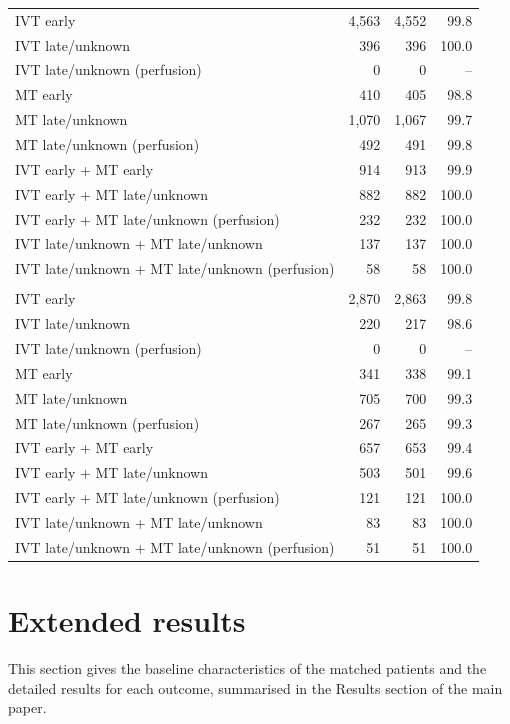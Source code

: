 {\begin{longtable}{p{7cm}rrr}
IVT early & 4,563 & 4,552 & 99.8 \\
IVT late/unknown & 396 & 396 & 100.0 \\
IVT late/unknown (perfusion) & 0 & 0 & -- \\
MT early & 410 & 405 & 98.8 \\
MT late/unknown & 1,070 & 1,067 & 99.7 \\
MT late/unknown (perfusion) & 492 & 491 & 99.8 \\
IVT early + MT early & 914 & 913 & 99.9 \\
IVT early + MT late/unknown & 882 & 882 & 100.0 \\
IVT early + MT late/unknown (perfusion) & 232 & 232 & 100.0 \\
IVT late/unknown + MT late/unknown & 137 & 137 & 100.0 \\
IVT late/unknown + MT late/unknown (perfusion) & 58 & 58 & 100.0 \\
\addlinespace
\multicolumn{4}{l}{\textbf{NIHSS 21--25} (untreated pool: 9,424)}\\
IVT early & 2,870 & 2,863 & 99.8 \\
IVT late/unknown & 220 & 217 & 98.6 \\
IVT late/unknown (perfusion) & 0 & 0 & -- \\
MT early & 341 & 338 & 99.1 \\
MT late/unknown & 705 & 700 & 99.3 \\
MT late/unknown (perfusion) & 267 & 265 & 99.3 \\
IVT early + MT early & 657 & 653 & 99.4 \\
IVT early + MT late/unknown & 503 & 501 & 99.6 \\
IVT early + MT late/unknown (perfusion) & 121 & 121 & 100.0 \\
IVT late/unknown + MT late/unknown & 83 & 83 & 100.0 \\
IVT late/unknown + MT late/unknown (perfusion) & 51 & 51 & 100.0 \\
\end{longtable}
}

\section{Extended results}\label{sec:supp_results}

This section gives the baseline characteristics of the matched patients and the detailed results for each outcome, summarised in the Results section of the main paper.

